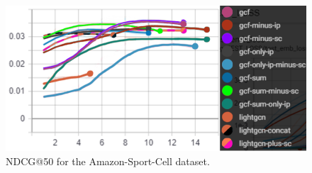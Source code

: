 \begin{figure}[h!]
    \includegraphics[width=\linewidth]{figures/amazon-cell-sport-gcf-all-ndcg.png}
    \caption{NDCG@50 for the Amazon-Sport-Cell dataset.}
    \label{fig:GCF-NDCG-ablation-study-amazon-cell-sport}
\end{figure}
